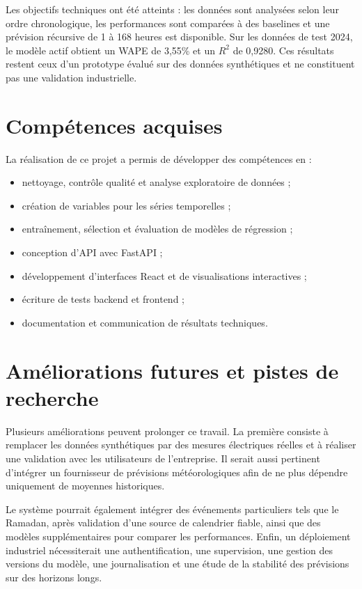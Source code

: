 \documentclass[12pt,a4paper]{report}
\begin{document}
Les objectifs techniques ont été atteints : les données sont analysées selon
leur ordre chronologique, les performances sont comparées à des baselines et
une prévision récursive de 1 à 168 heures est disponible. Sur les données de
test 2024, le modèle actif obtient un WAPE de 3,55\% et un $R^2$ de 0,9280.
Ces résultats restent ceux d'un prototype évalué sur des données synthétiques
et ne constituent pas une validation industrielle.

\section{Compétences acquises}

La réalisation de ce projet a permis de développer des compétences en :

\begin{itemize}
	\item nettoyage, contrôle qualité et analyse exploratoire de données ;
	\item création de variables pour les séries temporelles ;
	\item entraînement, sélection et évaluation de modèles de régression ;
	\item conception d'API avec FastAPI ;
	\item développement d'interfaces React et de visualisations interactives ;
	\item écriture de tests backend et frontend ;
	\item documentation et communication de résultats techniques.
\end{itemize}

\section{Améliorations futures et pistes de recherche}

Plusieurs améliorations peuvent prolonger ce travail. La première consiste à
remplacer les données synthétiques par des mesures électriques réelles et à
réaliser une validation avec les utilisateurs de l'entreprise. Il serait aussi
pertinent d'intégrer un fournisseur de prévisions météorologiques afin de ne
plus dépendre uniquement de moyennes historiques.

Le système pourrait également intégrer des événements particuliers tels que
le Ramadan, après validation d'une source de calendrier fiable, ainsi que des
modèles supplémentaires pour comparer les performances. Enfin, un déploiement
industriel nécessiterait une authentification, une supervision, une gestion
des versions du modèle, une journalisation et une étude de la stabilité des
prévisions sur des horizons longs.
\end{document}
